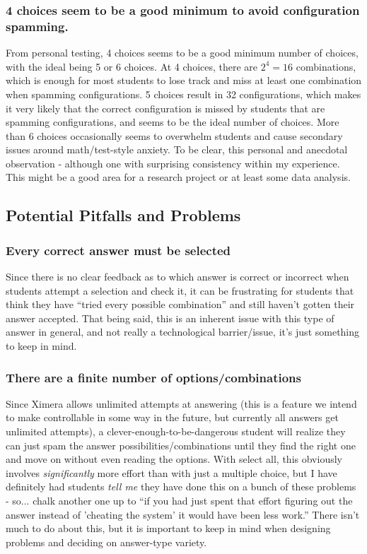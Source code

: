 \documentclass{ximera}
\begin{document}
        \subsubsection*{4 choices seem to be a good minimum to avoid configuration spamming.}
            From personal testing, 4 choices seems to be a good minimum number of choices, with the ideal being 5 or 6 choices. At 4 choices, there are $2^4 = 16$ combinations, which is enough for most students to lose track and miss at least one combination when spamming configurations. 5 choices result in 32 configurations, which makes it very likely that the correct configuration is missed by students that are spamming configurations, and seems to be the ideal number of choices. More than 6 choices occasionally seems to overwhelm students and cause secondary issues around math/test-style anxiety. To be clear, this personal and anecdotal observation - although one with surprising consistency within my experience. This might be a good area for a research project or at least some data analysis.
        
    \subsection*{Potential Pitfalls and Problems}
        
        \subsubsection*{Every correct answer must be selected}
            Since there is no clear feedback as to which answer is correct or incorrect when students attempt a selection and check it, it can be frustrating for students that think they have ``tried every possible combination'' and still haven't gotten their answer accepted. That being said, this is an inherent issue with this type of answer in general, and not really a technological barrier/issue, it's just something to keep in mind.
            
        \subsubsection*{There are a finite number of options/combinations}
            Since Ximera allows unlimited attempts at answering (this is a feature we intend to make controllable in some way in the future, but currently all answers get unlimited attempts), a clever-enough-to-be-dangerous student will realize they can just spam the answer possibilities/combinations until they find the right one and move on without even reading the options. With select all, this obviously involves \textit{significantly} more effort than with just a multiple choice, but I have definitely had students \textit{tell me} they have done this on a bunch of these problems - so... chalk another one up to ``if you had just spent that effort figuring out the answer instead of 'cheating the system' it would have been less work.'' There isn't much to do about this, but it is important to keep in mind when designing problems and deciding on answer-type variety.
            
\end{document}
